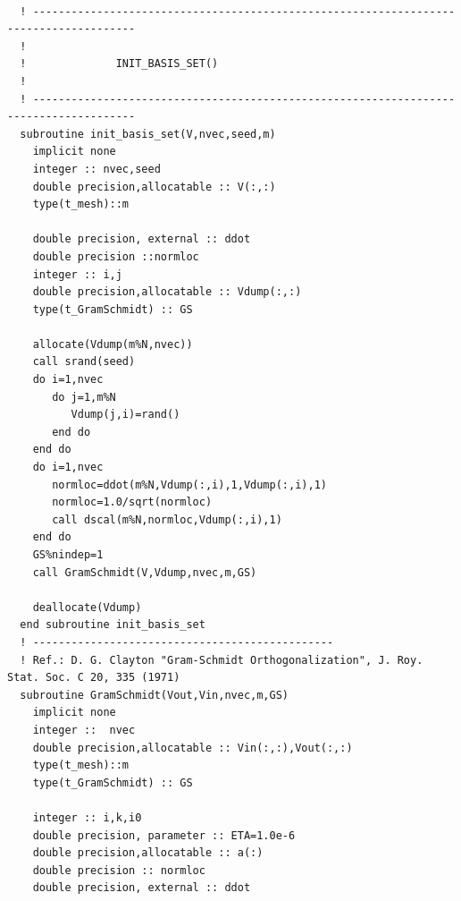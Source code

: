 \documentclass[11pt,a4paper]{article}
\begin{document}
\begin{verbatim}
  
  ! --------------------------------------------------------------------------------------
  !
  !              INIT_BASIS_SET()
  !
  ! --------------------------------------------------------------------------------------
  subroutine init_basis_set(V,nvec,seed,m)
    implicit none
    integer :: nvec,seed
    double precision,allocatable :: V(:,:)
    type(t_mesh)::m

    double precision, external :: ddot
    double precision ::normloc
    integer :: i,j
    double precision,allocatable :: Vdump(:,:)
    type(t_GramSchmidt) :: GS
    
    allocate(Vdump(m%N,nvec))
    call srand(seed)
    do i=1,nvec
       do j=1,m%N
          Vdump(j,i)=rand()
       end do
    end do
    do i=1,nvec
       normloc=ddot(m%N,Vdump(:,i),1,Vdump(:,i),1)
       normloc=1.0/sqrt(normloc)
       call dscal(m%N,normloc,Vdump(:,i),1)
    end do
    GS%nindep=1
    call GramSchmidt(V,Vdump,nvec,m,GS)

    deallocate(Vdump)
  end subroutine init_basis_set
  ! -----------------------------------------------
  ! Ref.: D. G. Clayton "Gram-Schmidt Orthogonalization", J. Roy. Stat. Soc. C 20, 335 (1971)
  subroutine GramSchmidt(Vout,Vin,nvec,m,GS)
    implicit none
    integer ::  nvec
    double precision,allocatable :: Vin(:,:),Vout(:,:)
    type(t_mesh)::m
    type(t_GramSchmidt) :: GS
    
    integer :: i,k,i0
    double precision, parameter :: ETA=1.0e-6
    double precision,allocatable :: a(:)
    double precision :: normloc
    double precision, external :: ddot


\end{verbatim}
\end{document}
